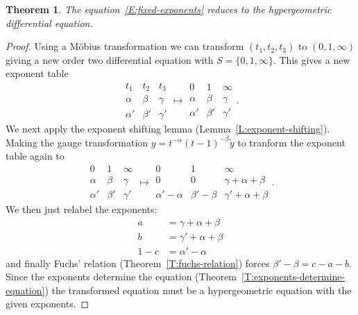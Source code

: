 \documentclass[]{book}
\numberwithin{equation}{section}
\newtheorem{theorem}{Theorem}[subsection]
\theoremstyle{definition}
\theoremstyle{remark}
\begin{document}
\begin{theorem}
	The equation~\ref{E:fixed-exponents} reduces to the hypergeometric differential equation.
\end{theorem}
\begin{proof}
Using a M\"obius transformation we can transform $(t_1,t_2,t_3)$ to $(0,1,\infty)$ giving a new order two differential equation with $S = \lbrace 0,1,\infty\rbrace$.
This gives a new exponent table
	$$\begin{array}{ccc}
	t_1 & t_2 & t_3 \\
	\hline \hline \alpha & \beta & \gamma \\
	\alpha' & \beta' & \gamma' 
	\end{array} \mapsto \begin{array}{ccc}
		0& 1 & \infty \\
		\hline \hline \alpha & \beta & \gamma \\
		\alpha' & \beta' & \gamma' 
	\end{array}.$$
We next apply the exponent shifting lemma (Lemma~\ref{L:exponent-shifting}).
Making the gauge transformation $y = t^{-\alpha}(t-1)^{-\beta}\widetilde{y}$ to tranform the exponent table again to
 	$$\begin{array}{ccc}
 	0& 1 & \infty \\
 	\hline \hline \alpha & \beta & \gamma \\
 	\alpha' & \beta' & \gamma' 
 	\end{array} \mapsto \begin{array}{ccc}
 0& 1 & \infty \\
 \hline \hline 0& 0 & \gamma +\alpha +\beta \\
 \alpha' -\alpha& \beta'-\beta & \gamma' +\alpha+\beta
 \end{array}.$$
 We then just relabel the exponents:
   \begin{align*}
   a &= \gamma +\alpha +\beta\\
   b &= \gamma' +\alpha+\beta\\
   1-c &= \alpha' -\alpha 
   \end{align*}
  and finally Fuchs' relation (Theorem~\ref{T:fuchs-relation}) forces $\beta'-\beta=c-a-b$.
  Since the exponents determine the equation (Theorem~\ref{T:exponents-determine-equation}) the transformed equation must be a hypergeometric equation with the given exponents. 
\end{proof}

\end{document}
